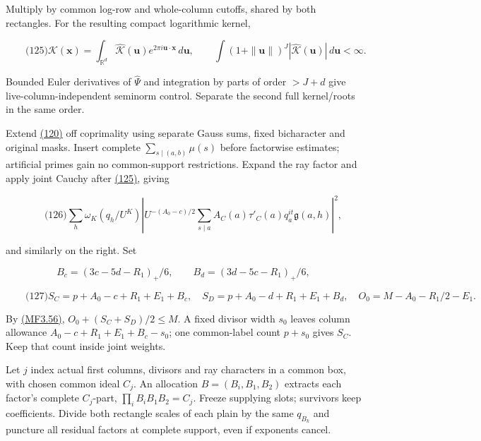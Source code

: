 Multiply by common log-row and whole-column cutoffs, shared by both rectangles. For the resulting compact logarithmic kernel,

\hypertarget{sr:full-kernel}{}

\label{sr:full-kernel}

\[
\qquad\text{(125)}
 \mathcal K(\mathbf x)=\int_{\mathbb R^d}\widehat{\mathcal K}(\mathbf u)
       e^{2\pi i\mathbf u\cdot\mathbf x}\,d\mathbf u,\qquad
 \int(1+\|\mathbf u\|)^J|\widehat{\mathcal K}(\mathbf u)|\,d\mathbf u<\infty.
\]

Bounded Euler derivatives of \(\widehat\Psi\) and integration by parts of order \(>J+d\) give live-column-independent seminorm control. Separate the second full kernel/roots in the same order.

Extend \protect\hyperlink{sr:first-poisson}{(120)} off coprimality using separate Gauss sums, fixed bicharacter and original masks. Insert complete \(\sum_{s\mid(a,b)}\mu(s)\) before factorwise estimates; artificial primes gain no common-support restrictions. Expand the ray factor and apply joint Cauchy after \protect\hyperlink{sr:full-kernel}{(125)}, giving

\hypertarget{sr:gauss-column}{}

\label{sr:gauss-column}

\[
\qquad\text{(126)}
 \sum_h\omega_K(q_h/U^K)
 \left|U^{-(A_0-c)/2}\sum_{s\mid a}
       A_C(a)\tau'_C(a)q_a^{it}\mathfrak g(a,h)\right|^2,
\]

and similarly on the right. Set

\[
B_c=(3c-5d-R_1)_+/6,\qquad B_d=(3d-5c-R_1)_+/6,
\]

\hypertarget{sr:target-exponents}{}

\label{sr:target-exponents}

\[
\qquad\text{(127)}
 S_C=p+A_0-c+R_1+E_1+B_c,\quad
 S_D=p+A_0-d+R_1+E_1+B_d,\quad
 O_0=M-A_0-R_1/2-E_1.
\]

By \protect\hyperlink{mf:eq:B3.56}{(MF3.56)}, \(O_0+(S_C+S_D)/2\le M\). A fixed divisor width \(s_0\) leaves column allowance \(A_0-c+R_1+E_1+B_c-s_0\); one common-label count \(p+s_0\) gives \(S_C\). Keep that count inside joint weights.

Let \(j\) index actual first columns, divisors and ray characters in a common box, with chosen common ideal \(C_j\). An allocation \(B=(B_i,B_1,B_2)\) extracts each factor's complete \(C_j\)-part, \(\prod_iB_iB_1B_2=C_j\). Freeze supplying slots; survivors keep coefficients. Divide both rectangle scales of each plain by the same \(q_{B_k}\) and puncture all residual factors at complete support, even if exponents cancel.

